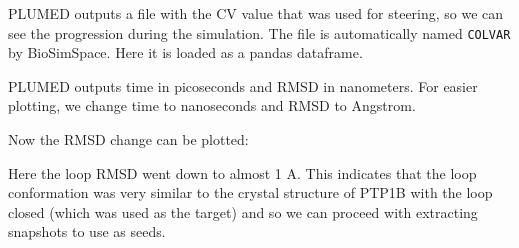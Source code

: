 PLUMED outputs a file with the CV value that was used for steering, so
we can see the progression during the simulation. The file is
automatically named \texttt{COLVAR} by BioSimSpace. Here it is loaded as
a pandas dataframe.

\begin{Shaded}
\begin{Highlighting}[]
\OperatorTok{=} 
\OperatorTok{=}\OperatorTok{=}\OperatorTok{=}\OperatorTok{=}\OperatorTok{=}\NormalTok{)}
\end{Highlighting}
\end{Shaded}

PLUMED outputs time in picoseconds and RMSD in nanometers. For easier
plotting, we change time to nanoseconds and RMSD to Angstrom.

\begin{Shaded}
\begin{Highlighting}[]
\NormalTok{df[}\NormalTok{] }\OperatorTok{=}\NormalTok{ df[}\NormalTok{]}\OperatorTok{/}
\NormalTok{df[}\NormalTok{] }\OperatorTok{=}\NormalTok{ df[}\NormalTok{]}\OperatorTok{*}
\OperatorTok{=}\NormalTok{)}
\end{Highlighting}
\end{Shaded}

Now the RMSD change can be plotted:

\begin{Shaded}
\begin{Highlighting}[]
\OperatorTok{=}\NormalTok{ df[}\NormalTok{].plot(figsize}\OperatorTok{=}\NormalTok{(}\NormalTok{,}\NormalTok{))}
\NormalTok{)}
\NormalTok{)}
\NormalTok{, }\NormalTok{)}
\end{Highlighting}
\end{Shaded}

Here the loop RMSD went down to almost 1 A. This indicates that the loop
conformation was very similar to the crystal structure of PTP1B with the
loop closed (which was used as the target) and so we can proceed with
extracting snapshots to use as seeds.

